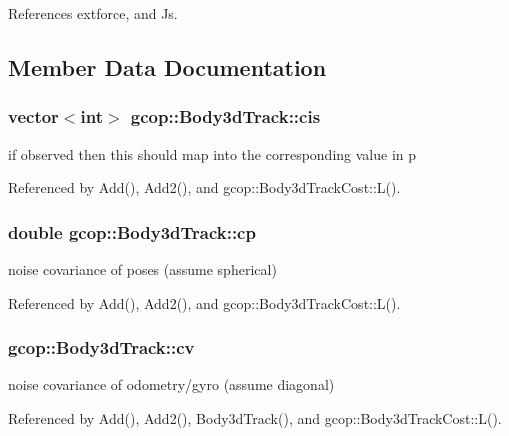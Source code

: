 \-References extforce, and \-Js.



\subsection{\-Member \-Data \-Documentation}
\subsubsection[{cis}]{\setlength{\rightskip}{0pt plus 5cm}vector$<$int$>$ {\bf gcop\-::\-Body3d\-Track\-::cis}}\label{classgcop_1_1Body3dTrack_a020921b649ae58489e80d0574924f6a1}


if observed then this should map into the corresponding value in p 



\-Referenced by \-Add(), \-Add2(), and gcop\-::\-Body3d\-Track\-Cost\-::\-L().

\subsubsection[{cp}]{\setlength{\rightskip}{0pt plus 5cm}double {\bf gcop\-::\-Body3d\-Track\-::cp}}\label{classgcop_1_1Body3dTrack_ab234cc5de56f174f7da44bbc2f23d297}


noise covariance of poses (assume spherical) 



\-Referenced by \-Add(), \-Add2(), and gcop\-::\-Body3d\-Track\-Cost\-::\-L().

\subsubsection[{cv}]{ {\bf gcop\-::\-Body3d\-Track\-::cv}}\label{classgcop_1_1Body3dTrack_a59f0e7ea9990c75a1165ddce29347e47}


noise covariance of odometry/gyro (assume diagonal) 



\-Referenced by \-Add(), \-Add2(), \-Body3d\-Track(), and gcop\-::\-Body3d\-Track\-Cost\-::\-L().

